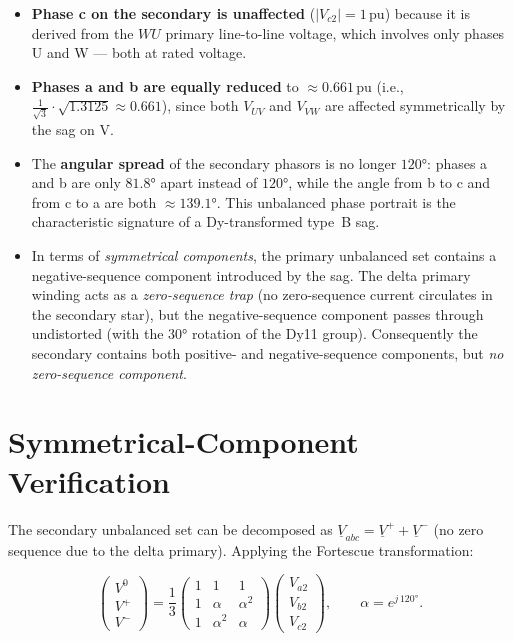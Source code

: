 \documentclass[a4paper,11pt]{article}
\begin{document}
\begin{itemize}
  \item \textbf{Phase c on the secondary is unaffected} ($|V_{c2}|=1\,\mathrm{pu}$)
        because it is derived from the $WU$ primary line-to-line voltage,
        which involves only phases U and W — both at rated voltage.

  \item \textbf{Phases a and b are equally reduced} to $\approx 0.661\,\mathrm{pu}$
        (i.e., $\tfrac{1}{\sqrt{3}} \cdot \sqrt{1.3125} \approx 0.661$),
        since both $V_{UV}$ and $V_{VW}$ are affected symmetrically by the
        sag on V.

  \item The \textbf{angular spread} of the secondary phasors is no longer
        $120°$: phases a and b are only $81.8°$ apart instead of $120°$,
        while the angle from b to c and from c to a are both $\approx 139.1°$.
        This unbalanced phase portrait is the characteristic signature of a
        Dy-transformed type~B sag.

  \item In terms of \emph{symmetrical components}, the primary unbalanced
        set contains a negative-sequence component introduced by the sag.
        The delta primary winding acts as a \emph{zero-sequence trap} (no
        zero-sequence current circulates in the secondary star), but the
        negative-sequence component passes through undistorted (with the
        $30°$ rotation of the Dy11 group).  Consequently the secondary
        contains both positive- and negative-sequence components, but
        \emph{no zero-sequence component}.
\end{itemize}

\section{Symmetrical-Component Verification}
\label{sec:symcomp}

The secondary unbalanced set can be decomposed as
$\underline{V}_{abc} = \underline{V}^{+} + \underline{V}^{-}$
(no zero sequence due to the delta primary).
Applying the Fortescue transformation:

\begin{equation}
\begin{pmatrix}V^0\\V^+\\V^-\end{pmatrix}
= \frac{1}{3}
\begin{pmatrix}1&1&1\\1&\alpha&\alpha^2\\1&\alpha^2&\alpha\end{pmatrix}
\begin{pmatrix}V_{a2}\\V_{b2}\\V_{c2}\end{pmatrix},
\qquad \alpha = e^{j\,120°}.
\end{equation}
\end{document}
